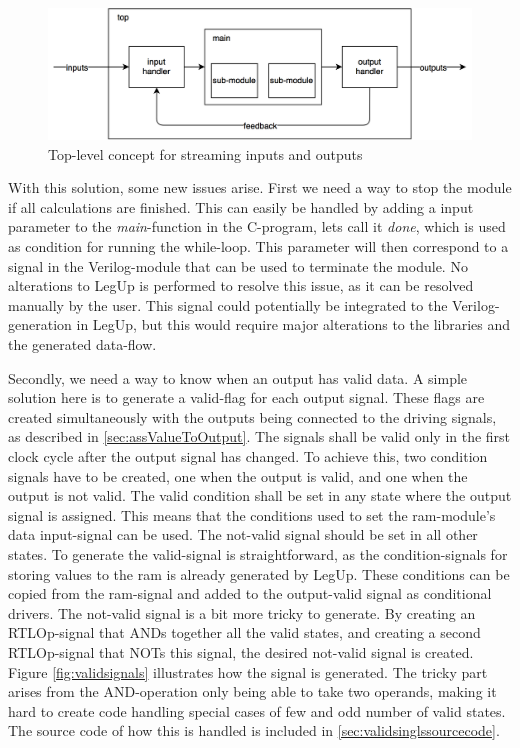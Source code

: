 \begin{figure}[H]%
\centering
\includegraphics[width=\textwidth]{../figs/StreamingInputs.png}
\caption{\label{fig:steamininputstop}Top-level concept for streaming inputs and outputs}
\end{figure}

With this solution, some new issues arise. First we need a way to stop the module if all calculations are finished. This can easily be handled by adding a input parameter to the \textit{main}-function in the C-program, lets call it \textit{done}, which is used as condition for running the while-loop. This parameter will then correspond to a signal in the Verilog-module that can be used to terminate the module. No alterations to LegUp is performed to resolve this issue, as it can be resolved manually by the user. This signal could potentially be integrated to the Verilog-generation in LegUp, but this would require major alterations to the libraries and the generated data-flow.

Secondly, we need a way to know when an output has valid data. A simple solution here is to generate a valid-flag for each output signal. These flags are created simultaneously with the outputs being connected to the driving signals, as described in \ref{sec:assValueToOutput}. The signals shall be valid only in the first clock cycle after the output signal has changed. To achieve this, two condition signals have to be created, one when the output is valid, and one when the output is not valid. The valid condition shall be set in any state where the output signal is assigned. This means that the conditions used to set the \gls{ram}-module's data input-signal can be used. The not-valid signal should be set in all other states. To generate the valid-signal is straightforward, as the condition-signals for storing values to the \gls{ram} is already generated by LegUp. These conditions can be copied from the \gls{ram}-signal and added to the output-valid signal as conditional drivers. The not-valid signal is a bit more tricky to generate. By creating an RTLOp-signal that ANDs together all the valid states, and creating a second RTLOp-signal that NOTs this signal, the desired not-valid signal is created. Figure \ref{fig:validsignals} illustrates how the signal is generated. The tricky part arises from the AND-operation only being able to take two operands, making it hard to create code handling special cases of few and odd number of valid states. The source code of how this is handled is included in \cref{sec:validsinglssourcecode}.

